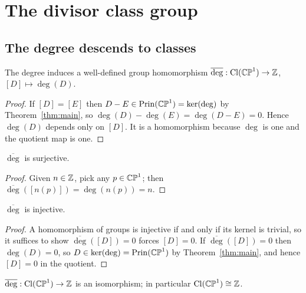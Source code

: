\section{The divisor class group}\label{sec:cl}

\subsection{The degree descends to classes}

\begin{smjproposition}\label{prop:descend}
The degree induces a well-defined group homomorphism
$\overline{\deg} : \operatorname{Cl}(\mathbb{CP}^1) \to \mathbb{Z}$, $[D] \mapsto \deg(D)$.
\end{smjproposition}

\begin{proof}
If $[D] = [E]$ then $D - E \in \operatorname{Prin}(\mathbb{CP}^1) = \ker(\deg)$ by
Theorem~\ref{thm:main}, so $\deg(D) - \deg(E) = \deg(D-E) = 0$. Hence
$\deg(D)$ depends only on $[D]$. It is a homomorphism because $\deg$ is one and
the quotient map is one.
\end{proof}

\begin{smjproposition}\label{prop:surj}
$\overline{\deg}$ is surjective.
\end{smjproposition}

\begin{proof}
Given $n \in \mathbb{Z}$, pick any $p \in \mathbb{CP}^1$; then $\overline{\deg}([n(p)]) =
\deg(n(p)) = n$.
\end{proof}

\begin{smjproposition}\label{prop:inj}
$\overline{\deg}$ is injective.
\end{smjproposition}

\begin{proof}
A homomorphism of groups is injective if and only if its kernel is trivial, so it
suffices to show $\overline{\deg}([D]) = 0$ forces $[D] = 0$. If
$\overline{\deg}([D]) = 0$ then $\deg(D) = 0$, so $D \in \ker(\deg) =
\operatorname{Prin}(\mathbb{CP}^1)$ by Theorem~\ref{thm:main}, and hence $[D] = 0$ in the quotient.
\end{proof}

\begin{theorem}\label{thm:cl}
$\overline{\deg} : \operatorname{Cl}(\mathbb{CP}^1) \to \mathbb{Z}$ is an isomorphism; in particular
$\operatorname{Cl}(\mathbb{CP}^1) \cong \mathbb{Z}$.
\end{theorem}

